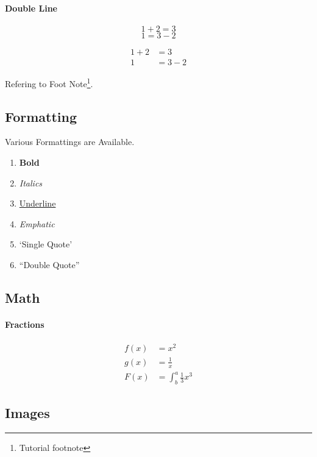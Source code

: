 \documentclass{article}[a4paper,12pt]
\begin{document}
\paragraph*{Double Line}

\begin{equation*}
  1 + 2 = 3 
\end{equation*}
\begin{equation*}
  1 = 3 - 2
\end{equation*}

\begin{align*}
  1 + 2 &= 3\\
  1 &= 3 - 2
\end{align*}

Refering to Foot Note\footnote{\label{myfootnote}Tutorial footnote}.

\subsection{Formatting}

Various Formattings are Available.
\begin{enumerate}
  \item \textbf{Bold}
  \item \textit{Italics}
  \item \underline{Underline}
  \item \emph{Emphatic}
  \item `Single Quote'
  \item ``Double Quote''
\end{enumerate}

\subsection{Math}

\paragraph{Fractions}
\begin{align*}
  f(x) &= x^2\\
  g(x) &= \frac{1}{x}\\
  F(x) &= \int^a_b \frac{1}{3}x^3
\end{align*}

\newpage

\subsection{Images}
\end{document}
